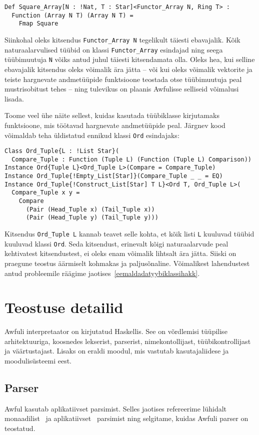 \documentclass[12pt]{article}
\newcommand\peatykk[1]{
  \clearpage
  \section{#1}}
\begin{document}
      \begin{verbatim}Def Square_Array[N : !Nat, T : Star]<Functor_Array N, Ring T> :
  Function (Array N T) (Array N T) =
    Fmap Square\end{verbatim}

      Siinkohal oleks kitsendus \verb!Functor_Array N! tegelikult täiesti ebavajalik. Kõik naturaalarvulised tüübid on klassi \verb!Functor_Array! esindajad ning seega tüübimuutuja \verb!N! võiks antud juhul täiesti kitsendamata olla. Oleks hea, kui selline ebavajalik kitsendus oleks võimalik ära jätta -- või kui oleks võimalik vektorite ja teiste hargnevate andmetüüpide funktsioone teostada otse tüübimuutuja peal mustrisobitust tehes -- ning tulevikus on plaanis Awfulisse selliseid võimalusi lisada.

      Toome veel ühe näite sellest, kuidas kasutada tüübiklasse kirjutamaks funktsioone, mis töötavad hargnevate andmetüüpide peal. Järgnev kood võimaldab teha üldistatud ennikud klassi \verb!Ord! esindajaks:

      \begin{verbatim}Class Ord_Tuple{L : !List Star}(
  Compare_Tuple : Function (Tuple L) (Function (Tuple L) Comparison))
Instance Ord{Tuple L}<Ord_Tuple L>(Compare = Compare_Tuple)
Instance Ord_Tuple{!Empty_List[Star]}(Compare_Tuple _ _ = EQ)
Instance Ord_Tuple{!Construct_List[Star] T L}<Ord T, Ord_Tuple L>(
  Compare_Tuple x y =
    Compare
      (Pair (Head_Tuple x) (Tail_Tuple x))
      (Pair (Head_Tuple y) (Tail_Tuple y)))\end{verbatim}

      Kitsendus \verb!Ord_Tuple L! kannab teavet selle kohta, et kõik listi \verb!L! kuuluvad tüübid kuuluvad klassi \verb!Ord!. Seda kitsendust, erinevalt kõigi naturaalarvude peal kehtivatest kitsendustest, ei oleks enam võimalik lihtsalt ära jätta. Siiski on praegune teostus äärmiselt kohmakas ja paljusõnaline. Võimalikest lahendustest antud probleemile räägime jaotises~\ref{eemaldadatyybiklassihakk}.
  \peatykk{Teostuse detailid}
    Awfuli interpretaator on kirjutatud Haskellis. See on võrdlemisi tüüpilise arhitektuuriga, koosnedes lekserist, parserist, nimekontollijast, tüübikontrollijast ja väärtustajast. Lisaks on eraldi moodul, mis vastutab kasutajaliidese ja moodulisüsteemi eest.
    \subsection{Parser}
      Awful kasutab aplikatiivset parsimist. Selles jaotises refereerime lühidalt monaadilist~\cite{Mon} ja aplikatiivset~\cite{App} parsimist ning selgitame, kuidas Awfuli parser on teostatud.
\end{document}
